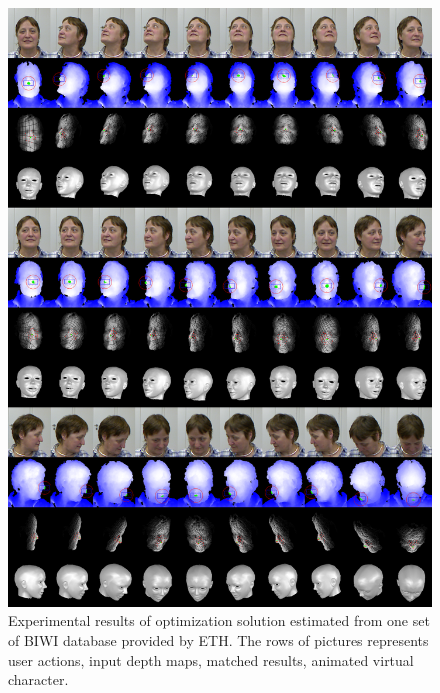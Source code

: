 \begin{figure}
\includegraphics[width=1.0\linewidth]{./figure/biwi_result_01.png}
\caption{Experimental results of optimization solution estimated from one set of BIWI database provided by ETH. The rows of pictures represents user actions, input depth maps, matched results, animated virtual character.}
\label{f:m2 result biwi 01}       %
\end{figure}

